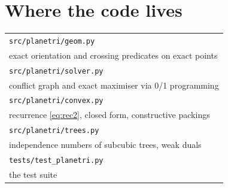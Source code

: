 \documentclass[11pt]{article}
\theoremstyle{plain}
\theoremstyle{definition}
\theoremstyle{remark}
\begin{document}
\section{Where the code lives}

\begin{center}\small
\begin{tabular}{@{}l@{}}
\texttt{src/planetri/geom.py}\\[-2pt]
\quad exact orientation and crossing predicates on exact points\\[4pt]
\texttt{src/planetri/solver.py}\\[-2pt]
\quad conflict graph and exact maximiser via 0/1 programming\\[4pt]
\texttt{src/planetri/convex.py}\\[-2pt]
\quad recurrence \eqref{eq:rec2}, closed form, constructive packings\\[4pt]
\texttt{src/planetri/trees.py}\\[-2pt]
\quad independence numbers of subcubic trees, weak duals\\[4pt]
\texttt{tests/test\_planetri.py}\\[-2pt]
\quad the test suite
\end{tabular}
\end{center}
\end{document}
